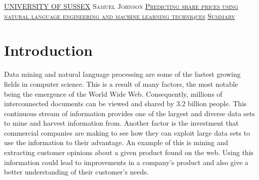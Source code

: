 \documentclass[a4paper,11pt]{report}
\newcommand{\linespacing}{1.5}
\renewcommand{\baselinestretch}{\linespacing}
\begin{document}
\thispagestyle{empty}
\newpage
\null\vskip10mm
\begin{center}
\large
\underline{UNIVERSITY OF SUSSEX}
\vskip20mm
\textsc{Samuel Johnson}
\vskip20mm
\underline{\textsc{Predicting share prices using natural language engineering and machine learning techniques}}
\vskip0mm
\vskip20mm
\underline{\textsc{Summary}}
\vskip2mm
\end{center}
\renewcommand{\baselinestretch}{1.0}
\small\normalsize





\newpage
{}
\tableofcontents
\listoftables
{}
{}
\listoffigures
{}
{}


\newpage
{}


\chapter{Introduction}
\label{chap:intro}

Data mining and natural language processing are some of the fastest growing fields in computer science. This is a result of many factors, the most notable being the emergence of the World Wide Web.  Consequently, millions of interconnected documents can be viewed and shared by 3.2 billion people. This continuous stream of information provides one of the largest and diverse data sets to mine and harvest information from. Another factor is the investment that commercial companies are making to see how they can exploit large data sets to use the information to their advantage. An example of this is mining and extracting customer opinions about a given product found on the web. Using this information could lead to improvements in a company's product and also give a better understanding of their customer's needs.
\end{document}
